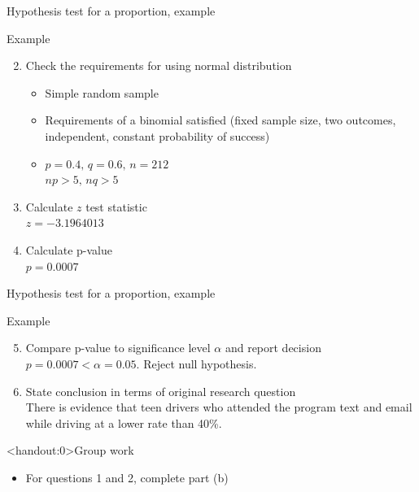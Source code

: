 \documentclass[xcolor=table, handout]{beamer}
\begin{document}
\begin{frame}{Hypothesis test for a proportion, example}
\begin{exampleblock}{Example}
\large
\begin{enumerate}
\setcounter{enumi}{1}
\item Check the requirements for using normal distribution
\pause\begin{itemize}
\item Simple random sample
\item Requirements of a binomial satisfied (fixed sample size, two outcomes, independent, constant probability of success)
\item $p=0.4, \, q=0.6, \, n=212$\\
$np > 5, \, nq >5$
\end{itemize}
\pause\item Calculate $z$ test statistic\\
\pause$z = -3.1964013$
\pause\item Calculate p-value\\
\pause$p = 0.0007$
\end{enumerate}
\end{exampleblock}
\end{frame}

\begin{frame}{Hypothesis test for a proportion, example}
\begin{exampleblock}{Example}
\large
\begin{enumerate}
\setcounter{enumi}{4}
\item Compare p-value to significance level $\alpha$ and report decision\\
\pause$p = 0.0007 < \alpha =0.05$. Reject null hypothesis.

\pause\item State conclusion in terms of original research question\\
\pause There is evidence that teen drivers who attended the program text and email while driving at a lower rate than 40\%.
\end{enumerate}

\end{exampleblock}
\end{frame}

\begin{frame}<handout:0>{Group work}
\begin{block}{}
\large
\begin{itemize}
\item For questions 1 and 2, complete part (b)
\end{itemize}
\end{block}
\end{frame}
\end{document}
